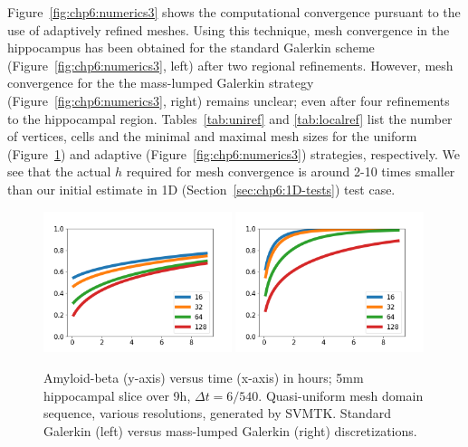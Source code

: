 Figure~\ref{fig:chp6:numerics3} shows the computational convergence pursuant to 
the use of adaptively refined meshes.  Using this technique, mesh convergence 
in the hippocampus has been obtained for the standard Galerkin scheme 
(Figure~\ref{fig:chp6:numerics3}, left) after two regional refinements.  However, 
mesh convergence for the the mass-lumped Galerkin strategy 
(Figure~\ref{fig:chp6:numerics3}, right) remains unclear; even after four 
refinements to the hippocampal region.  Tables~\ref{tab:uniref} 
and \ref{tab:localref} list the number of vertices, cells and the minimal and 
maximal mesh sizes for the uniform (Figure~\ref{fig:chp6:numerics2}) and 
adaptive (Figure~\ref{fig:chp6:numerics3}) strategies, respectively.  We see that 
the actual $h$ required for mesh convergence is around 2-10 times smaller than 
our initial estimate in 1D (Section~\ref{sec:chp6:1D-tests}) test 
case.  

\begin{figure}	
\includegraphics[width=0.49\textwidth]{./chapters/chp6/FIG/tracer_hippocampus_uniform_notlump.png}
\includegraphics[width=0.49\textwidth]{./chapters/chp6/FIG/tracer_hippocampus_uniform_lump.png}
\caption{
Amyloid-beta (y-axis) versus time (x-axis) in hours; 5mm hippocampal slice over 
9h, $\Delta t = 6/540$. Quasi-uniform mesh domain sequence, various resolutions, generated by SVMTK. 
Standard Galerkin (left) versus mass-lumped Galerkin (right) discretizations.
}
\label{fig:chp6:numerics2}
\end{figure}

